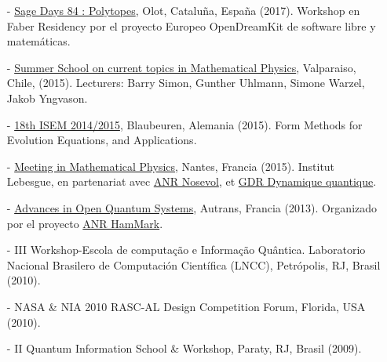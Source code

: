 \documentclass[10pt]{article}
\begin{document}
\vspace{-0.75cm}

\begin{itemize}

\item[-] \href{http://faberresidency.com/residences/mathematics-february-march-2017/}{Sage Days 84 : Polytopes}, Olot, Cataluña, España (2017). Workshop en Faber Residency por el proyecto Europeo OpenDreamKit de software libre y matemáticas.

\item[-] \href{http://www.fis.puc.cl/~smp2015/frontpage.html}{Summer School on current topics in Mathematical Physics}, Valparaiso, Chile, (2015). Lecturers: Barry Simon, Gunther Uhlmann, Simone Warzel, Jakob Yngvason.

\item[-] \href{http://www.math.kit.edu/iana3/page/isem/en}{18th ISEM 2014/2015}, Blaubeuren, Alemania (2015). Form Methods for Evolution Equations, and Applications.

\item[-] \href{http://www.lebesgue.fr/content/sem2015-math-phy}{Meeting in Mathematical Physics}, Nantes, Francia (2015). Institut Lebesgue, en partenariat avec \href{http://www.math.sciences.univ-nantes.fr/NOSEVOL/node/2}{ANR Nosevol}, et \href{http://www.math.sciences.univ-nantes.fr/dynqua/Accueil}{GDR Dynamique quantique}.

\item[-] \href{http://pillet.univ-tln.fr/aoqs/www/}{Advances in Open Quantum Systems}, Autrans, Francia (2013). Organizado por el proyecto \href{http://bruneau.u-cergy.fr/ANR/ANR.html}{ANR HamMark}.

\item[-] III Workshop-Escola de computação e Informação Quântica. Laboratorio Nacional Brasilero de Computación Científica (LNCC), Petrópolis, RJ, Brasil (2010). %

\item[-] NASA \& NIA 2010 RASC-AL Design Competition Forum, Florida, USA (2010). 

\item[-] II Quantum Information School \& Workshop, Paraty, RJ, Brasil (2009).

\end{itemize}
\end{document}
